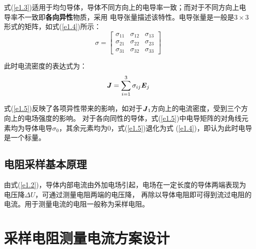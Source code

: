 \documentclass[UTF8]{ctexart}
\numberwithin{equation}{section} %
\numberwithin{figure}{section}
\begin{document}
    式(\ref{e1.3})适用于均匀导体，导体不同方向上的电导率一致；而对于不同方向上电导率不一致即\textbf{各向异性}物质，采用
    电导张量描述该特性。电导张量是一般是$3 \times 3$形式的矩阵，如式(\ref{e1.4})所示：
    \begin{equation}
        \sigma = 
        \begin{bmatrix} %
            \sigma_{11} &   \sigma_{12} &   \sigma_{13} \\ %
            \sigma_{21} &   \sigma_{22} &   \sigma_{23} \\
            \sigma_{31} &   \sigma_{32} &   \sigma_{33}  %
        \end{bmatrix}
        \label{e1.4}
    \end{equation}

    此时电流密度的表达式为：
    \begin{equation}
        \textbf{\emph{J}} = \sum_{i=1}^{3}\sigma_{ij} {\textbf{\emph{E}}_j}
        \label{e1.5}
    \end{equation}

    式(\ref{e1.5})反映了各项异性带来的影响，如对于$\textbf{\emph{J}}_1$方向上的电流密度，受到三个方向上的电场强度的影响。
    对于各向同性的导体，式(\ref{e1.5})中电导矩阵的对角线元素均为导体电导$\sigma_0$，其余元素均为0，式(\ref{e1.5})退化为式
    (\ref{e1.4})，即认为此时电导是一个标量。

\subsection{电阻采样基本原理}
    由式(\ref{e1.2})，导体内部电流由外加电场引起，电场在一定长度的导体两端表现为电压降$\Delta U$，可通过测量电阻两端的电压降，
    再除以导体电阻即可得到流过电阻的电流。用于测量电流的电阻一般称为采样电阻。


\section{采样电阻测量电流方案设计}
\end{document}

